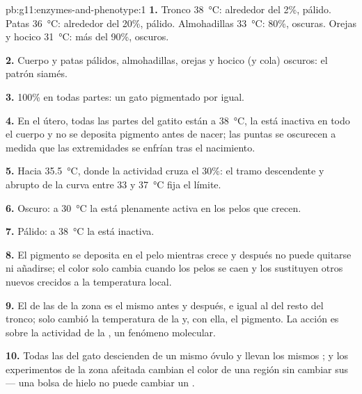 \begin{solution}{pb:g11:enzymes-and-phenotype:1}
\textbf{1.} Tronco \qty{38}{\celsius}: alrededor del 2\%, pálido. Patas
\qty{36}{\celsius}: alrededor del 20\%, pálido. Almohadillas
\qty{33}{\celsius}: 80\%, oscuras. Orejas y hocico \qty{31}{\celsius}:
más del 90\%, oscuros.

\textbf{2.} Cuerpo y patas pálidos, almohadillas, orejas y hocico (y
cola) oscuros: el patrón siamés.

\textbf{3.} 100\% en todas partes: un gato pigmentado por igual.

\textbf{4.} En el útero, todas las partes del gatito están a
\qty{38}{\celsius}, la  está inactiva en todo el cuerpo y no se
deposita pigmento antes de nacer; las puntas se oscurecen a medida que
las extremidades se enfrían tras el nacimiento.

\textbf{5.} Hacia \qty{35.5}{\celsius}, donde la actividad cruza el
30\%: el tramo descendente y abrupto de la curva entre 33 y
\qty{37}{\celsius} fija el límite.

\textbf{6.} Oscuro: a \qty{30}{\celsius} la  está plenamente
activa en los pelos que crecen.

\textbf{7.} Pálido: a \qty{38}{\celsius} la  está inactiva.

\textbf{8.} El pigmento se deposita en el pelo mientras crece y después
no puede quitarse ni añadirse; el color solo cambia cuando los pelos se
caen y los sustituyen otros nuevos crecidos a la temperatura local.

\textbf{9.} El  de las  de la zona es el mismo antes y
después, e igual al del resto del tronco; solo cambió la temperatura de
la  y, con ella, el pigmento. La acción es sobre la actividad de
la , un fenómeno molecular.

\textbf{10.} Todas las  del gato descienden de un mismo óvulo y
llevan los mismos ; y los experimentos de la zona afeitada
cambian el color de una región sin cambiar sus  --- una bolsa de
hielo no puede cambiar un .


\end{solution}
